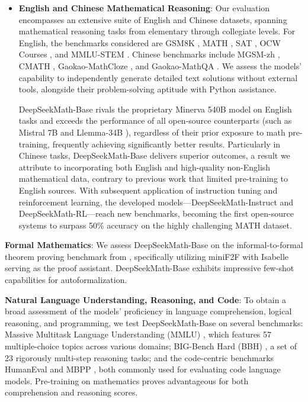 \begin{itemize}[topsep=0pt]
    \item \textbf{English and Chinese Mathematical Reasoning}: Our evaluation encompasses an extensive suite of English and Chinese datasets, spanning mathematical reasoning tasks from elementary through collegiate levels. For English, the benchmarks considered are GSM8K \citep{gsm8k}, MATH \citep{MATH}, SAT \citep{llemma}, OCW Courses \citep{minerva}, and MMLU-STEM \citep{mmlu}. Chinese benchmarks include MGSM-zh \citep{mgsm}, CMATH \citep{wei2023cmath}, Gaokao-MathCloze \citep{agieval}, and Gaokao-MathQA \citep{agieval}. We assess the models' capability to independently generate detailed text solutions without external tools, alongside their problem-solving aptitude with Python assistance.

    DeepSeekMath-Base rivals the proprietary Minerva 540B model \citep{minerva} on English tasks and exceeds the performance of all open-source counterparts (such as Mistral 7B \citep{mistral} and Llemma-34B \citep{llemma}), regardless of their prior exposure to math pre-training, frequently achieving significantly better results. Particularly in Chinese tasks, DeepSeekMath-Base delivers superior outcomes, a result we attribute to incorporating both English and high-quality non-English mathematical data, contrary to previous work \citep{minerva,llemma} that limited pre-training to English sources. With subsequent application of instruction tuning and reinforcement learning, the developed models—DeepSeekMath-Instruct and DeepSeekMath-RL—reach new benchmarks, becoming the first open-source systems to surpass 50\% accuracy on the highly challenging MATH dataset.
\end{itemize}

\item \textbf{Formal Mathematics}: We assess DeepSeekMath-Base on the informal-to-formal theorem proving benchmark from \citep{dsp_proof}, specifically utilizing miniF2F \citep{minif2f} with Isabelle \citep{isabelle} serving as the proof assistant. DeepSeekMath-Base exhibits impressive few-shot capabilities for autoformalization.

\item \textbf{Natural Language Understanding, Reasoning, and Code}: To obtain a broad assessment of the models' proficiency in language comprehension, logical reasoning, and programming, we test DeepSeekMath-Base on several benchmarks: Massive Multitask Language Understanding (MMLU) \citep{mmlu}, which features 57 multiple-choice topics across various domains; BIG-Bench Hard (BBH) \citep{bbh}, a set of 23 rigorously multi-step reasoning tasks; and the code-centric benchmarks HumanEval \citep{codex} and MBPP \citep{mbpp}, both commonly used for evaluating code language models. Pre-training on mathematics proves advantageous for both comprehension and reasoning scores.


